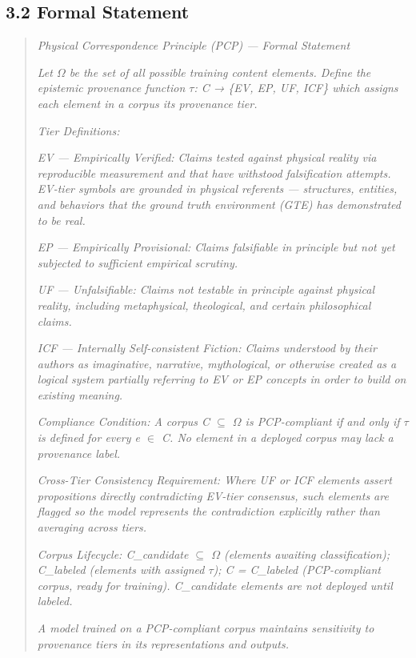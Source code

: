 \documentclass[
]{article}
\begin{document}
\subsection{3.2 Formal Statement}\label{formal-statement}

\begin{quote}
\emph{Physical Correspondence Principle (PCP) --- Formal Statement}

\emph{Let $\Omega$ be the set of all possible training content elements. Define
the epistemic provenance function $\tau$: C → \{EV, EP, UF, ICF\} which
assigns each element in a corpus its provenance tier.}

\emph{Tier Definitions:}

\emph{EV --- Empirically Verified: Claims tested against physical
reality via reproducible measurement and that have withstood
falsification attempts. EV-tier symbols are grounded in physical
referents --- structures, entities, and behaviors that the ground truth
environment (GTE) has demonstrated to be real.}

\emph{EP --- Empirically Provisional: Claims falsifiable in principle
but not yet subjected to sufficient empirical scrutiny.}

\emph{UF --- Unfalsifiable: Claims not testable in principle against
physical reality, including metaphysical, theological, and certain
philosophical claims.}

\emph{ICF --- Internally Self-consistent Fiction: Claims understood by
their authors as imaginative, narrative, mythological, or otherwise
created as a logical system partially referring to EV or EP concepts in
order to build on existing meaning.}

\emph{Compliance Condition: A corpus C $\subseteq$ $\Omega$ is PCP-compliant if and only
if $\tau$ is defined for every e $\in$ C. No element in a deployed corpus may
lack a provenance label.}

\emph{Cross-Tier Consistency Requirement: Where UF or ICF elements
assert propositions directly contradicting EV-tier consensus, such
elements are flagged so the model represents the contradiction
explicitly rather than averaging across tiers.}

\emph{Corpus Lifecycle: C\_candidate $\subseteq$ $\Omega$ (elements awaiting
classification); C\_labeled (elements with assigned $\tau$); C = C\_labeled
(PCP-compliant corpus, ready for training). C\_candidate elements are
not deployed until labeled.}

\emph{A model trained on a PCP-compliant corpus maintains sensitivity to
provenance tiers in its representations and outputs.}
\end{quote}
\end{document}
